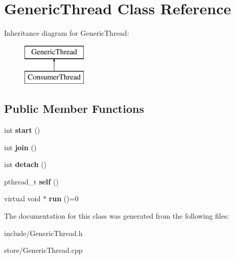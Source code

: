 \hypertarget{classGenericThread}{}\section{Generic\+Thread Class Reference}
\label{classGenericThread}
Inheritance diagram for Generic\+Thread\+:\begin{figure}[H]
\begin{center}
\leavevmode
\includegraphics[height=2.000000cm]{classGenericThread}
\end{center}
\end{figure}
\subsection*{Public Member Functions}
\begin{DoxyCompactItemize}
\item 
int {\bfseries start} ()\hypertarget{classGenericThread_ac1d8c3d7dcaae01e89c69093a065141f}{}\label{classGenericThread_ac1d8c3d7dcaae01e89c69093a065141f}

\item 
int {\bfseries join} ()\hypertarget{classGenericThread_a217ef41077ae00ce48372c03838af96a}{}\label{classGenericThread_a217ef41077ae00ce48372c03838af96a}

\item 
int {\bfseries detach} ()\hypertarget{classGenericThread_abd0849015ec4004b789aa3181853fbf6}{}\label{classGenericThread_abd0849015ec4004b789aa3181853fbf6}

\item 
pthread\+\_\+t {\bfseries self} ()\hypertarget{classGenericThread_a0ac1c8aa0c6f5d47d73626c13854d444}{}\label{classGenericThread_a0ac1c8aa0c6f5d47d73626c13854d444}

\item 
virtual void $\ast$ {\bfseries run} ()=0\hypertarget{classGenericThread_a54147ff9f16e7985e634b5f0d6d5b7f9}{}\label{classGenericThread_a54147ff9f16e7985e634b5f0d6d5b7f9}

\end{DoxyCompactItemize}


The documentation for this class was generated from the following files\+:\begin{DoxyCompactItemize}
\item 
include/Generic\+Thread.\+h\item 
store/Generic\+Thread.\+cpp\end{DoxyCompactItemize}
